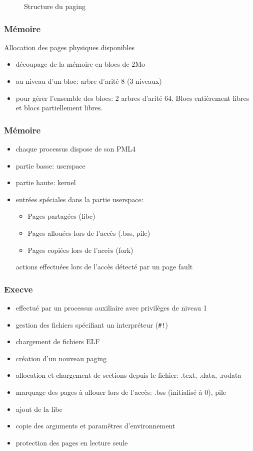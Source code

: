 \documentclass[10pt,a4paper]{beamer}
\begin{document}
\begin{frame}
\begin{figure}
\begin{tikzpicture}
  \end{tikzpicture}
    \caption{Structure du paging}
  \end{figure}

\end{frame}

\begin{frame}
  \frametitle{Mémoire}
  Allocation des pages physiques disponibles

  \begin{itemize}
  \item découpage de la mémoire en blocs de 2Mo
  \item au niveau d'un bloc: arbre d'arité 8 (3 niveaux)
  \item pour gérer l'ensemble des blocs:
    2 arbres d'arité 64. Blocs entièrement libres et blocs partiellement libres.
  \end{itemize}
\end{frame}

\begin{frame}
  \frametitle{Mémoire}

  \begin{itemize}
  \item chaque processus dispose de son PML4
  \item partie basse: userspace
  \item partie haute: kernel
  \item entrées spéciales dans la partie userspace:
    \begin{itemize}
    \item Pages partagées (libc)
    \item Pages allouées lors de l'accès (.bss, pile)
    \item Pages copiées lors de l'accès (fork)
    \end{itemize}
    actions effectuées lors de l'accès détecté par un page fault
  \end{itemize}
\end{frame}

\begin{frame}
  \frametitle{Execve}
  \begin{itemize}
  \item effectué par un processus auxiliaire avec privilèges de niveau 1
  \item gestion des fichiers spécifiant un interpréteur (\texttt{\#!})
  \item chargement de fichiers ELF
  \item création d'un nouveau paging
  \item allocation et chargement de sections depuis le fichier: .text, .data, .rodata
  \item marquage des pages à allouer lors de l'accès: .bss (initialisé à 0), pile
  \item ajout de la libc
  \item copie des arguments et paramêtres d'environnement
  \item protection des pages en lecture seule
  \end{itemize}
\end{frame}
\end{document}

